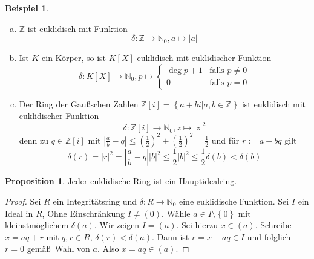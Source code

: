 \documentclass[
twoside=semi,
fontsize=12,
DIV=12, 
cleardoublepage=current,
leqno,
headings=optiontoheadandtoc, 
toc=idx
]{scrbook}
\newcommand{\N}{\mathbb{N}}
\newcommand{\Z}{\mathbb{Z}}
\newcommand{\brac}[1]{\left( #1 \right)}
\newcommand{\set}[1]{\left\{ #1 \right\}}
\theoremstyle{definition}
\newtheorem{beispiel}[definition]{Beispiel}
\newtheorem{proposition}[definition]{Proposition}
\begin{document}
	\begin{beispiel}\label{1.6.2}
		\begin{enumerate}[(a)]
			\item $\Z$ ist euklidisch mit Funktion 
				\[\delta: \Z \to \N_0, a \mapsto |a|\]
			\item Ist $K$ ein K\"orper, so ist $K[X]$ euklidisch mit euklidischer Funktion 
				\[\delta:K[X]\to\N_0, p \mapsto \begin{cases}
					\deg p + 1 & \textrm{falls } p \neq 0\\
					0 & \textrm{falls } p = 0
				\end{cases}\]
			\item Der Ring der Gaußschen Zahlen $\Z[i] = \set{a+bi|a,b \in \Z}$ ist euklidisch mit euklidischer Funktion 
				\[\delta: \Z[i] \to \N_0, z \mapsto |z|^2\]
			denn zu $q \in \Z[i]$ mit $\left| \frac{a}{b} - q\right| \leq \brac{\frac{1}{2}}^2 + \brac{\frac{1}{2}}^2 = \frac{1}{2}$ und f\"ur $r:= a - bq$ gilt 
				\[\delta(r) = |r|^2 = \left| \frac{a}{b} - q\right||b|^2 \leq \frac{1}{2}|b|^2 \leq \frac{1}{2}\delta(b) < \delta(b)\]
		\end{enumerate}
	\end{beispiel}

	\begin{proposition}\label{1.6.3}
		Jeder euklidische Ring ist ein Hauptidealring.
		
		\begin{proof}
			Sei $R$ ein Integrit\"atsring und $\delta:R\to\N_0$ eine euklidische Funktion. Sei $I$ ein Ideal in $R$, Ohne Einschr\"ankung $I \neq (0)$. W\"ahle $a \in I\setminus\set{0}$
			mit kleinstm\"oglichem $\delta(a)$. Wir zeigen $I= (a)$. Sei hierzu $x\in (a)$. Schreibe $x = aq+r$ mit $q,r \in R$, $\delta(r)< \delta(a)$. Dann ist $r = x-aq \in I$ und folglich $r=0$ gem\"a\ss\ Wahl von $a$. Also $x = aq \in (a)$.
		\end{proof}
	\end{proposition}
\end{document}
